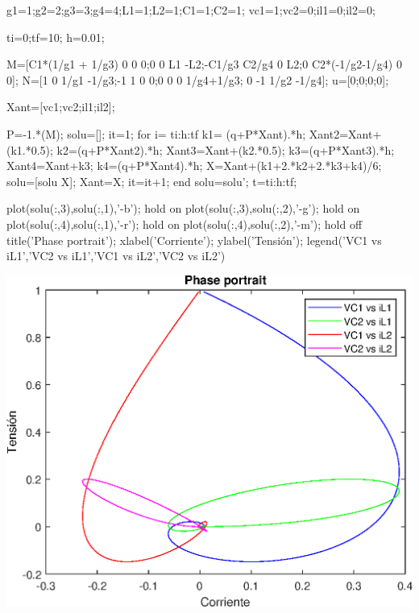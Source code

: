 \documentclass[10pt,a4paper]{article} %
\begin{document}
	
	\begin{matlabcode}
	g1=1;g2=2;g3=3;g4=4;L1=1;L2=1;C1=1;C2=1;
	vc1=1;vc2=0;il1=0;il2=0;
	
	ti=0;tf=10;
	h=0.01;
	
	
	M=[C1*(1/g1 + 1/g3) 0 0 0;0 0 L1 -L2;-C1/g3 C2/g4 0 L2;0 C2*(-1/g2-1/g4) 0 0];
	N=[1 0 1/g1 -1/g3;-1 1 0 0;0 0 0 1/g4+1/g3; 0 -1 1/g2 -1/g4];
	u=[0;0;0;0];
	
	Xant=[vc1;vc2;il1;il2];
	
	
	P=-1.*(M\N);
	solu=[];
	it=1;
	for i= ti:h:tf
	k1= (q+P*Xant).*h;
	Xant2=Xant+(k1.*0.5);
	k2=(q+P*Xant2).*h;
	Xant3=Xant+(k2.*0.5);
	k3=(q+P*Xant3).*h;
	Xant4=Xant+k3;
	k4=(q+P*Xant4).*h;
	X=Xant+(k1+2.*k2+2.*k3+k4)/6;
	solu=[solu X];
	Xant=X;
	it=it+1;
	end
	solu=solu';
	t=ti:h:tf;
	\end{matlabcode}
	
	
	\begin{matlabcode}
	plot(solu(:,3),solu(:,1),'-b');
	hold on 
	plot(solu(:,3),solu(:,2),'-g');
	hold on 
	plot(solu(:,4),solu(:,1),'-r');
	hold on 
	plot(solu(:,4),solu(:,2),'-m');
	hold off
	title('Phase portrait');
	xlabel('Corriente');
	ylabel('Tensión'); 
	legend({'VC1 vs iL1','VC2 vs iL1','VC1 vs iL2','VC2 vs iL2'})
	\end{matlabcode}
	\begin{center}
	\includegraphics[width=\maxwidth{56.196688409433015em}]{figure_0_07}
	\end{center}
	
\end{document}
